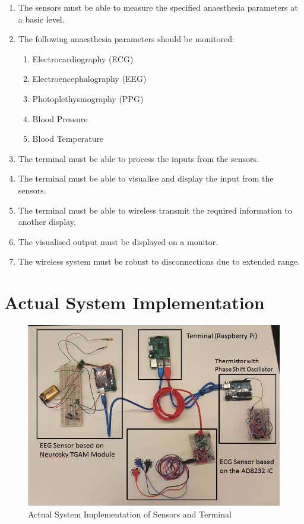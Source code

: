 \begin{enumerate}
	\item	The sensors must be able to measure the specified anaesthesia parameters at a basic level. 
	\item 	The following anaesthesia parameters should be monitored: 
	\begin{enumerate}
		\item Electrocardiography (ECG)
		\item Electroencephalography (EEG)
		\item Photoplethysmography (PPG)
		\item Blood Pressure
		\item Blood Temperature 
	\end{enumerate}
	\item	The terminal must be able to process the inputs from the sensors. 
	\item	The terminal must be able to visualise and display the input from the sensors. 
	\item	The terminal must be able to wireless transmit the required information to another display. 
	\item 	The visualised output must be displayed on a monitor. 
	\item	The wireless system must be robust to disconnections due to extended range. 
\end{enumerate}

\section{Actual System Implementation}

\begin{figure}[H]
	\centering
	\includegraphics[width=\linewidth]{entiresystemlabelled.jpg}
	\caption{Actual System Implementation of Sensors and Terminal}
\end{figure}